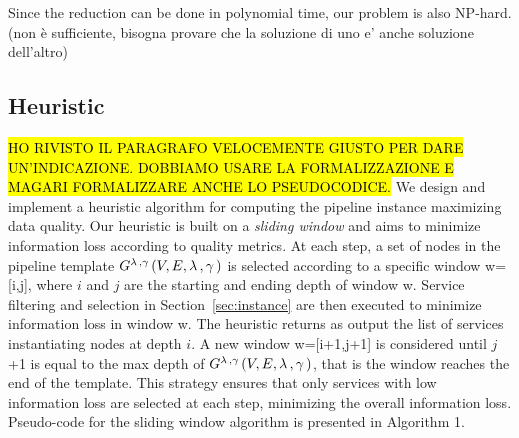 Since the reduction can be done in polynomial time, our problem is also NP-hard. (non è sufficiente, bisogna provare che la soluzione di uno e' anche soluzione dell'altro)


\begin{example}
\end{example}


\subsection{Heuristic}\label{subsec:heuristics}
\hl{HO RIVISTO IL PARAGRAFO VELOCEMENTE GIUSTO PER DARE UN'INDICAZIONE. DOBBIAMO USARE LA FORMALIZZAZIONE E MAGARI FORMALIZZARE ANCHE LO PSEUDOCODICE.} We design and implement a heuristic algorithm for computing the pipeline instance maximizing data quality. Our heuristic is built on a \emph{sliding window} and aims to minimize information loss according to quality metrics. At each step, a set of nodes in the pipeline template $G^{\lambda\,,\gamma\,}(V,E,\lambda\,,\gamma\,)$ is selected according to a specific window w=[i,j], where $i$ and $j$ are the starting and ending depth of window w. Service filtering and selection in Section~\ref{sec:instance} are then executed to minimize information loss in window w. The heuristic returns as output the list of services instantiating nodes at depth $i$. A new window w=[i+1,j+1] is considered until $j$+1 is equal to the max depth of $G^{\lambda\,,\gamma\,}(V,E,\lambda\,,\gamma\,)$, that is the window reaches the end of the template. 
This strategy ensures that only services with low information loss are selected at each step, minimizing the overall information loss. Pseudo-code for the sliding window algorithm is presented in Algorithm 1.

